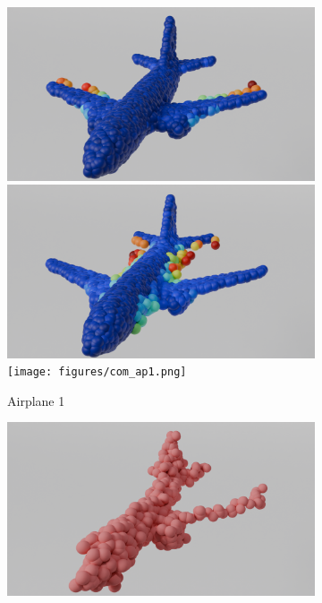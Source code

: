 \begin{figure}[htb]
\begin{subfigure}[t]{\textwidth+20pt\relax}
        \includegraphics[width=\dimexpr\linewidth-20pt\relax]{figures/ens_lin_ap1.png}
        \includegraphics[width=\dimexpr\linewidth-20pt\relax]{figures/iml_lin_ap1.png}
        \texttt{[image: figures/com\_ap1.png]}
        \caption{Airplane 1}
    \end{subfigure}\hfill
    \begin{subfigure}[t]{0.315\textwidth}
        \includegraphics[width=\textwidth]{figures/part_ap2.png}

\end{subfigure}
\end{figure}
